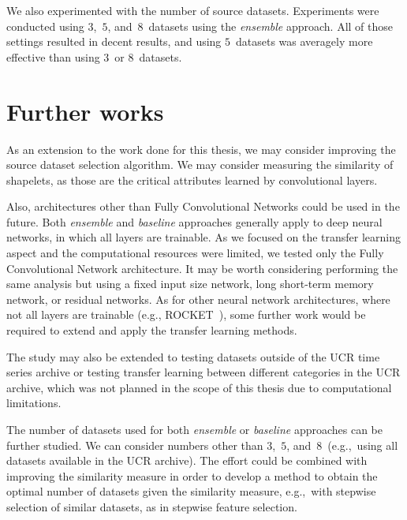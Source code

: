 \documentclass[a4paper,11pt,twoside]{report}
\theoremstyle{definition}
\begin{document}
We also experimented with the number of source datasets. Experiments were conducted using $3$,~$5$, and~$8$~datasets using the \textit{ensemble} approach. All of those settings resulted in decent results, and using $5$~datasets was averagely more effective than using $3$~or $8$~datasets.

\section{Further works}
As an extension to the work done for this thesis, we may consider improving the source dataset selection algorithm. We may consider measuring the similarity of shapelets, as those are the critical attributes learned by convolutional layers.

Also, architectures other than Fully Convolutional Networks could be used in the future. Both \textit{ ensemble }and\textit{ baseline} approaches generally apply to deep neural networks, in which all layers are trainable. As we focused on the transfer learning aspect and the computational resources were limited, we tested only the Fully Convolutional Network architecture. It may be worth considering performing the same analysis but using a fixed input size network, long short-term memory network, or residual networks. As for other neural network architectures, where not all layers are trainable (e.g., ROCKET~\cite{rocket}), some further work would be required to extend and apply the transfer learning methods.

The study may also be extended to testing datasets outside of the UCR time series archive or testing transfer learning between different categories in the UCR archive, which was not planned in the scope of this thesis due to computational limitations.

The number of datasets used for both \textit{ensemble} or \textit{baseline} approaches can be further studied. We can consider numbers other than $3$,~$5$, and~$8$~(e.g.,~using all datasets available in the UCR archive). The effort could be combined with improving the similarity measure in order to develop a method to obtain the optimal number of datasets given the similarity measure, e.g.,~with stepwise selection of similar datasets, as in stepwise feature selection.


\
\end{document}
